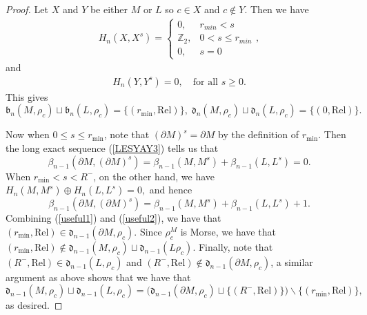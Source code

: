 \documentclass[10pt,a4paper]{amsart}
\newcommand{\Z}{\mathbb{Z}}
\begin{document}
\begin{proof}
Let $X$ and $Y$ be either $M$ or $L$ so $c\in X$ and $c\notin Y$. Then we have 
\begin{align}\label{step1}H_n(X,X^s)=\begin{cases} 0,&  r_{min} < s \\ \Z_2, & 0<s\leq r_{min}\\ 0, & s = 0\end{cases},\end{align} and 
\begin{align}\label{step2}H_n(Y,Y^s)=0, \quad \text{for all $s\ge 0$}. \end{align} 
This gives $$\mathfrak{b}_n(M,\rho_c)\sqcup  \mathfrak{b}_n(L,\rho_c)=\{(r_{\min},\text{Rel})\} ,\;
\mathfrak{d}_n(M,\rho_c)\sqcup  \mathfrak{d}_n(L,\rho_c) = \{(0,\text{Rel})\}.$$

Now when $0\leq s\leq r_{\min}$, note that $(\partial M)^s = \partial M$ by the definition of $r_{\min}$. Then the long exact sequence (\ref{LESYAY3}) tells us that 
\begin{equation}\label{useful1}
\beta_{n-1}(\partial M,(\partial M)^s) = \beta_{n-1}(M,M^s)+\beta_{n-1}(L,L^s)=0.\end{equation} When $r_{\min}< s< R^-$, on the other hand, we have $H_{n}(M,M^s)\oplus H_{n}(L,L^s)=0,$ and hence
\begin{equation}\label{useful2}\beta_{n-1}(\partial M,(\partial M)^s) = \beta_{n-1}(M,M^s)+\beta_{n-1}(L,L^s)+1.
\end{equation}
Combining (\ref{useful1}) and (\ref{useful2}), we have that $(r_{\min},\mathrm{Rel})\in \mathfrak{d}_{n-1}(\partial M,\rho_c).$ Since $\rho_c^M$ is Morse, we have that $(r_{\min},\mathrm{Rel})\not\in \mathfrak{d}_{n-1}(M,\rho_c)\sqcup \mathfrak{d}_{n-1}(L\rho_c)$. 
Finally, note that $(R^-,\mathrm{Rel})\in \mathfrak{d}_{n-1}(L,\rho_c)$ and $(R^-,\mathrm{Rel})\notin \mathfrak{d}_{n-1}(\partial M,\rho_c)$, a similar argument as above shows that we have that $$\mathfrak{d}_{n-1}(M,\rho_c)\sqcup  \mathfrak{d}_{n-1}(L,\rho_c)= \big(\mathfrak{d}_{n-1}(\partial M,\rho_c)\sqcup \{(R^-,\text{Rel})\} \big)\backslash \{(r_{\min},\text{Rel})\},$$ as desired.
\end{proof}
\end{document}
